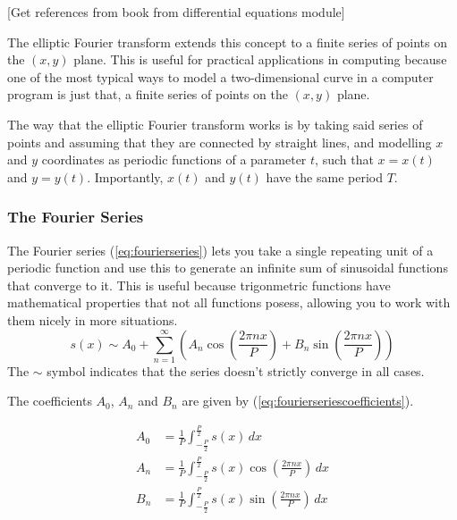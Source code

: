 \documentclass[12pt,english]{article}
\begin{document}
[Get references from book from differential equations module]

The elliptic Fourier transform extends this concept to a finite series of points
on the $(x, y)$ plane. This is useful for practical applications in
computing because one of the most typical ways to model a two-dimensional curve in
a computer program is just that, a finite series of points on the $(x, y)$ plane.

The way that the elliptic Fourier transform works is by taking said
series of points and assuming that they are connected by straight lines, and modelling
$x$ and $y$ coordinates as periodic functions of a parameter $t$, such that
$x = x(t)$ and $y = y(t)$. Importantly, $x(t)$ and $y(t)$ have the same period $T$.

\subsubsection{The Fourier Series}
The Fourier series
(\ref{eq:fourierseries})
lets you take a single repeating unit of a
periodic function and use this to generate an infinite sum of
sinusoidal functions that converge to it.
This is useful because trigonmetric functions have mathematical
properties that not all functions posess, allowing you to work
with them nicely in more situations.
\begin{equation}
	\label{eq:fourierseries}
	s(x) \sim A_0 + \sum_{n=1}^{\infty} \left(
		A_n \cos \left( \frac{2\pi nx}{P} \right) +
		B_n \sin \left( \frac{2\pi nx}{P} \right)
	\right)
\end{equation}
The \(\sim\) symbol indicates that the series doesn't strictly
converge in all cases.

The coefficients \(A_0\), \(A_n\) and \(B_n\) are given by
(\ref{eq:fourierseriescoefficients}).

\begin{equation}
\label{eq:fourierseriescoefficients}
\begin{aligned}
	A_0 &= \frac{1}{P} \int_{-\frac{P}{2}}^{\frac{P}{2}}
		s(x) \,dx \\
	A_n &= \frac{1}{P} \int_{-\frac{P}{2}}^{\frac{P}{2}}
		s(x) \cos \left(\frac{2\pi nx}{P}\right) \,dx \\
	B_n &= \frac{1}{P} \int_{-\frac{P}{2}}^{\frac{P}{2}}
		s(x) \sin \left(\frac{2\pi nx}{P}\right) \,dx \\
\end{aligned}
\end{equation}
\end{document}
